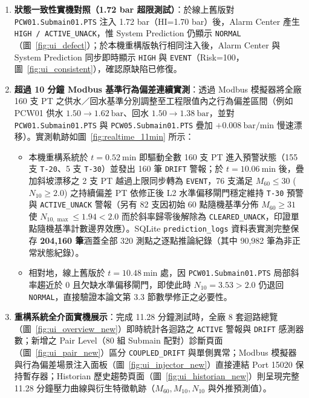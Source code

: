 \documentclass[fontset=none, a4paper, 12pt]{ctexart}
\begin{document}
\begin{doublespace}
\begin{enumerate}
    \item \textbf{狀態一致性實機對照（1.72 bar 超限測試）}：於線上舊版對 \texttt{PCW01.Submain01.PTS} 注入 1.72 bar（HI=1.70 bar）後，Alarm Center 產生 \texttt{HIGH / ACTIVE\_UNACK}，惟 System Prediction 仍顯示 \texttt{NORMAL}（圖~\ref{fig:ui_defect}）；於本機重構版執行相同注入後，Alarm Center 與 System Prediction 同步即時顯示 \texttt{HIGH} 與 \texttt{EVENT}（Risk=100，圖~\ref{fig:ui_consistent}），確認原缺陷已修復。
    \item \textbf{超過 10 分鐘 Modbus 基準行為偏差連續實測}：透過 Modbus 模擬器將全廠 160 支 PT 之供水／回水基準分別調整至工程限值內之行為偏差區間（例如 PCW01 供水 $1.50\to 1.62\ \mathrm{bar}$、回水 $1.50\to 1.38\ \mathrm{bar}$，並對 \texttt{PCW01.Submain01.PTS} 與 \texttt{PCW05.Submain01.PTS} 疊加 $+0.008\ \mathrm{bar/min}$ 慢速漂移）。實測軌跡如圖~\ref{fig:realtime_11min} 所示：
    \begin{itemize}
        \item 本機重構系統於 $t=0.52\ \mathrm{min}$ 即驅動全數 160 支 PT 進入預警狀態（155 支 \texttt{T-20}、5 支 \texttt{T-30}）並發出 160 筆 \texttt{DRIFT} 警報；於 $t=10.06\ \mathrm{min}$ 後，疊加斜坡漂移之 2 支 PT 越過上限同步轉為 \texttt{EVENT}，76 支滿足 $M_{60}\le 30$ ($N_{10}\ge 2.0$) 之持續偏差 PT 依修正後 L2 水準偏移閘門穩定維持 \texttt{T-30} 預警與 \texttt{ACTIVE\_UNACK} 警報（另有 82 支因初始 60 點隨機基準分佈 $M_{60}\ge 31$ 使 $N_{10,\max} \le 1.94 < 2.0$ 而於斜率歸零後解除為 \texttt{CLEARED\_UNACK}，印證單點隨機基準計數邊界效應）。SQLite \texttt{prediction\_logs} 資料表實測完整保存 \textbf{204,160 筆}涵蓋全部 320 測點之逐點推論紀錄（其中 90,982 筆為非正常狀態紀錄）。
        \item 相對地，線上舊版於 $t=10.48\ \mathrm{min}$ 處，因 \texttt{PCW01.Submain01.PTS} 局部斜率趨近於 0 且欠缺水準偏移閘門，即使此時 $N_{10}=3.53 > 2.0$ 仍退回 \texttt{NORMAL}，直接驗證本論文第 3.3 節數學修正之必要性。
    \end{itemize}
    \item \textbf{重構系統全介面實機展示}：完成 11.28 分鐘測試時，全廠 8 套迴路總覽（圖~\ref{fig:ui_overview_new}）即時統計各迴路之 \texttt{ACTIVE} 警報與 \texttt{DRIFT} 感測器數；新增之 Pair Level（80 組 Submain 配對）診斷頁面（圖~\ref{fig:ui_pair_new}）區分 \texttt{COUPLED\_DRIFT} 與單側異常；Modbus 模擬器與行為偏差場景注入面板（圖~\ref{fig:ui_injector_new}）直接連結 Port 15020 保持暫存器；Historian 歷史趨勢頁面（圖~\ref{fig:ui_historian_new}）則呈現完整 11.28 分鐘壓力曲線與衍生特徵軌跡（$M_{60}, M_{10}, N_{10}$ 與外推預測值）。
\end{enumerate}


\end{doublespace}
\end{document}
